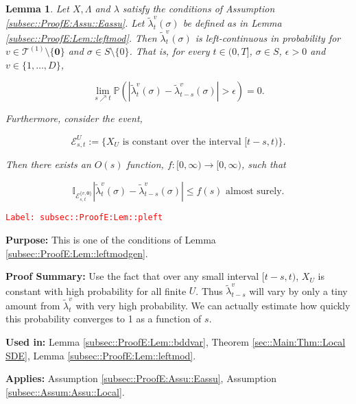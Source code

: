 \documentclass[12pt]{article}
\newcommand{\mb}{\mathbb}
\newcommand{\mc}{\mathcal}
\newcommand{\ra}{\rightarrow}
\newcommand{\te}{\text}
\newcommand{\ep}{\epsilon}
\newcommand{\tr}{\textcolor{red}}
\newcommand{\labe}[1]{\tr{\texttt{Label: #1}}}
\newcommand{\purpose}{\textbf{Purpose: }}
\newcommand{\pfsum}{\textbf{Proof Summary: }}
\newcommand{\usein}{\textbf{Used in: }}
\newcommand{\app}{\textbf{Applies: }}
\newcommand{\pr}{\mb{P}}							%
\renewcommand{\root}{\mathbf{0}}				%
\renewcommand{\v}{v}							%
\renewcommand{\U}{U}							%
\renewcommand{\S}{S}							%
\newcommand{\s}{\sigma}							%
\newcommand{\T}{T}								%
\renewcommand{\t}{t}							%
\renewcommand{\tt}{s}							%
\newcommand{\X}{X}								%
\newcommand{\vind}[1]{^{#1}}					%
\newcommand{\cind}[1]{_{#1}}					%
\newcommand{\ts}[1]{_{#1}}						%
\newcommand{\degr}{D}							%
\newcommand{\tree}{\mc{T}}						%
\newcommand{\sln}[1]{^{(#1)}}					%
\newcommand{\rate}{\lambda}						%
\newcommand{\alt}[1]{\widetilde{#1}}			%
\newcommand{\evnt}{\mc{E}}						%
\newcommand{\ratee}{\Lambda}					%
\newcommand{\crate}{\alt{\lambda}}				%
\newtheorem{lem}[thms]{Lemma}
\begin{document}
\begin{lem}
Let \(\X,\ratee\) and \(\rate\) satisfy the conditions of Assumption \ref{subsec::ProofE:Assu::Eassu}. Let \(\crate\vind{\v}\ts{\t}(\s)\) be defined as in Lemma \ref{subsec::ProofE:Lem::leftmod}. Then \(\crate\vind{\v}\ts{\t}(\s)\) is left-continuous in probability for \(\v \in \tree\sln{1}\setminus\{\root\}\) and \(\s \in \S\setminus\{0\}\). That is, for every \(\t \in (0,\T]\), \(\s \in \S\), \(\ep > 0\) and \(\v\in \{1,\dots,\degr\}\),

\[\lim_{\tt \nearrow \t}\pr\left(|\crate\vind{\v}\ts{\t}(\s)- \crate\vind{\v}\ts{\t-\tt}(\s)| > \ep\right) = 0.\]

Furthermore, consider the event,

\[\evnt\vind{\U}\ts{\tt,\t} := \{\X\cind{\U} \te{ is constant over the interval } [\t-\tt,\t)\}.\]

Then there exists an \(O(\tt)\) function, \(f:[0,\infty)\ra[0,\infty)\), such that 

\[\mb{I}_{\evnt\vind{\{\v,\root\}}\ts{\tt,\t}}|\crate\vind{\v}\ts{\t}(\s) - \crate\vind{\v}\ts{\t-\tt}(\s)| \leq f(\tt) \te{ almost surely.}\]
\label{subsec::ProofE:Lem::pleft}
\end{lem}
\labe{subsec::ProofE:Lem::pleft}

\purpose This is one of the conditions of Lemma \ref{subsec::ProofE:Lem::leftmodgen}.

\pfsum Use the fact that over any small interval \([\t-\tt,\t)\), \(\X\cind{U}\) is constant with high probability for all finite \(U\). Thus \(\crate\vind{v}\ts{\t-\tt}\) will vary by only a tiny amount from \(\crate\vind{v}\ts{\t}\) with very high probability. We can actually estimate how quickly this probability converges to 1 as a function of \(s\).

\usein Lemma \ref{subsec::ProofE:Lem::bddvar}, Theorem \ref{sec::Main:Thm::Local SDE}, Lemma \ref{subsec::ProofE:Lem::leftmod}.

\app Assumption \ref{subsec::ProofE:Assu::Eassu}, Assumption \ref{subsec::Assum:Assu::Local}.
\end{document}
